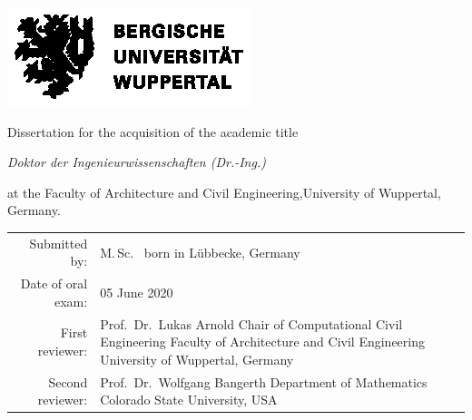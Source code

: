 \begin{titlingpage}
  \begin{center}
    \vspace*{\fill}
    \includegraphics[width=.75\textwidth]{logos/BUW_Logo-schwarz.eps}\bigskip
    \vspace*{\fill}\par
    {\LARGE Dissertation for the acquisition of the academic title\bigskip\par}
    {\LARGE \itshape Doktor der Ingenieurwissenschaften (Dr.-Ing.)\bigskip\par}
    {\LARGE at the Faculty of Architecture and Civil Engineering,\linebreak University of Wuppertal, Germany.\bigskip\par}
  \end{center}
  \vspace*{\fill}
  \begin{tabular}{rp{9cm}}
    \Large Submitted by: &
      \Large M.\,Sc.\ \theauthor{} \newline
      \normalsize born in Lübbecke, Germany \bigskip \bigskip \\
    \Large Date of oral exam: &
      \Large 05 June 2020 \bigskip \bigskip \\
    \Large First reviewer: &
      \Large Prof.\ Dr.\ Lukas Arnold \newline
      \normalsize Chair of Computational Civil Engineering \newline
      Faculty of Architecture and Civil Engineering \newline
      University of Wuppertal, Germany \newline \\
    \Large Second reviewer: &
      \Large Prof.\ Dr.\ Wolfgang Bangerth \newline 
      \normalsize Department of Mathematics \newline 
      Colorado State University, USA \\
  \end{tabular}
\end{titlingpage}